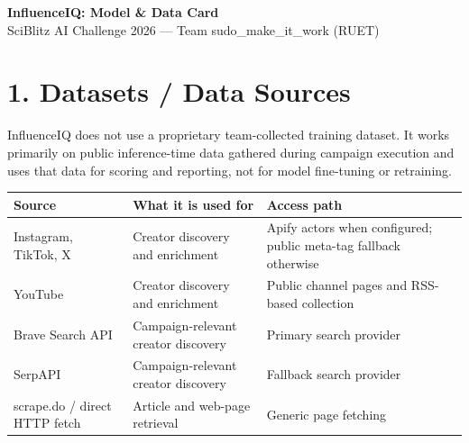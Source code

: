 \documentclass[10pt,a4paper]{article}
\begin{document}
\begin{center}
{\Large \textbf{InfluenceIQ: Model \& Data Card}}\\[2pt]
SciBlitz AI Challenge 2026 --- Team sudo\_make\_it\_work (RUET)
\end{center}

\section{1. Datasets / Data Sources}
InfluenceIQ does not use a proprietary team-collected training dataset. It works primarily on public inference-time data gathered during campaign execution and uses that data for scoring and reporting, not for model fine-tuning or retraining.

\begin{tabularx}{\textwidth}{@{}p{}p{}X@{}}
\toprule
\textbf{Source} & \textbf{What it is used for} & \textbf{Access path} \\
\midrule
Instagram, TikTok, X & Creator discovery and enrichment & Apify actors when configured; public meta-tag fallback otherwise \\
YouTube & Creator discovery and enrichment & Public channel pages and RSS-based collection \\
Brave Search API & Campaign-relevant creator discovery & Primary search provider \\
SerpAPI & Campaign-relevant creator discovery & Fallback search provider \\
scrape.do / direct HTTP fetch & Article and web-page retrieval & Generic page fetching \\
\bottomrule
\end{tabularx}
\end{document}
